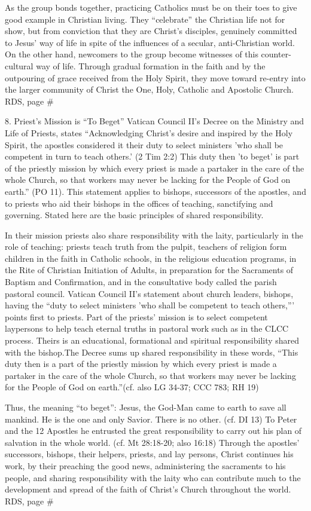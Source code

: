 \documentclass[oneside]{book}
\begin{document}
As the group bonds together, practicing Catholics must be on their toes to give
good example in Christian living. They ``celebrate'' the Christian life not for
show, but from conviction that they are Christ's disciples, genuinely committed
to Jesus' way of life in spite of the influences of a secular, anti-Christian
world. On the other hand, newcomers to the group become witnesses of this
counter-cultural way of life. Through gradual formation in the faith and by the
outpouring of grace received from the Holy Spirit, they move toward re-entry
into the larger community of Christ  the One, Holy, Catholic and Apostolic
Church.
RDS, page \#

8. Priest's Mission is ``To Beget''
Vatican Council II's Decree on the Ministry and Life of Priests, states
``Acknowledging Christ's desire and inspired by the Holy Spirit, the apostles
considered it their duty to select ministers 'who shall be competent in turn to
teach others.' (2 Tim 2:2) This duty then 'to beget' is part of the priestly
mission by which every priest is made a partaker in the care of the whole
Church, so that workers may never be lacking for the People of God on earth.''
(PO 11). This statement applies to bishops, successors of the apostles, and to
priests who aid their bishops in the offices of teaching, sanctifying and
governing. Stated here are the basic principles of shared responsibility.

In their mission priests also share responsibility with the laity, particularly
in the role of teaching: priests teach truth from the pulpit, teachers of
religion form children in the faith in Catholic schools, in the religious
education programs, in the Rite of Christian Initiation of Adults, in
preparation for the Sacraments of Baptism and Confirmation, and in the
consultative body called the parish pastoral council. Vatican Council II's
statement about church leaders, bishops, having the ``duty to select ministers
'who shall be competent to teach others,''' points first to priests. Part of the
priests' mission is to select competent laypersons to help teach eternal truths
in pastoral work such as in the CLCC process. Theirs is an educational,
formational and spiritual responsibility shared with the bishop.The Decree sums
up shared responsibility in these words, ``This duty then is a part of the
priestly mission by which every priest is made a partaker in the care of the
whole Church, so that workers may never be lacking for the People of God on
earth.''(cf. also LG 34-37; CCC 783; RH 19)

Thus, the meaning ``to beget'': Jesus, the God-Man came to earth to save all
mankind. He is the one and only Savior. There is no other. (cf. DI 13) To Peter
and the 12 Apostles he entrusted the great responsibility to carry out his plan
of salvation in the whole world. (cf. Mt 28:18-20; also 16:18) Through the
apostles' successors, bishops, their helpers, priests, and lay persons, Christ
continues his work, by their preaching the good news, administering the
sacraments to his people, and sharing responsibility with the laity who can
contribute much to the development and spread of the faith of Christ's Church
throughout the world.
RDS, page \#
\end{document}
